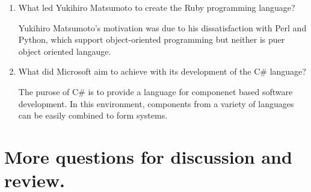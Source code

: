 \begin{enumerate}
\begin{answer}
    \end{answer}

  \item What led Yukihiro Matsumoto to create the Ruby programming language?

  \begin{answer}

    Yukihiro Matsumoto's motivation was due to his dissatisfaction with Perl and Python, which support object-oriented programming but neither is puer object oriented langauge.

    \end{answer}

  \item What did Microsoft aim to achieve with its development of the
    C\# language?

  \begin{answer}

    The purose of C\# is to provide a language for componenet based software development. In this environment, components from a variety of languages can be easily combined to form systems. 

    \end{answer}

  \end{enumerate}



\section{More questions for discussion and review.}

